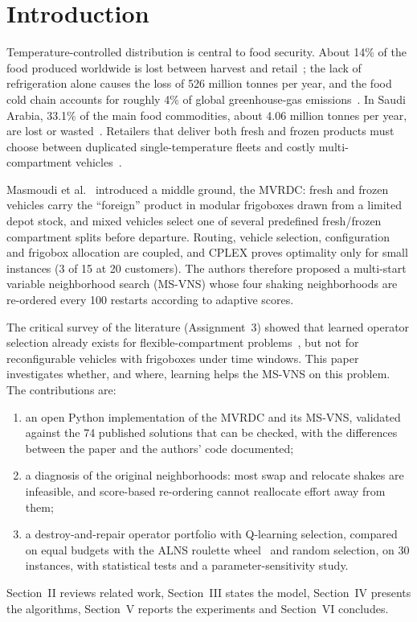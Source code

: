 \documentclass[conference]{IEEEtran}
\begin{document}
\section{Introduction}
Temperature-controlled distribution is central to food security. About 14\% of the food produced worldwide is lost between harvest and retail~\cite{fao2019}; the lack of refrigeration alone causes the loss of 526 million tonnes per year, and the food cold chain accounts for roughly 4\% of global greenhouse-gas emissions~\cite{unep2022}. In Saudi Arabia, 33.1\% of the main food commodities, about 4.06 million tonnes per year, are lost or wasted~\cite{alshabanat2021}. Retailers that deliver both fresh and frozen products must choose between duplicated single-temperature fleets and costly multi-compartment vehicles~\cite{ostermeier2021}.

Masmoudi et al.~\cite{masmoudi2026} introduced a middle ground, the MVRDC: fresh and frozen vehicles carry the ``foreign'' product in modular frigoboxes drawn from a limited depot stock, and mixed vehicles select one of several predefined fresh/frozen compartment splits before departure. Routing, vehicle selection, configuration and frigobox allocation are coupled, and CPLEX proves optimality only for small instances (3 of 15 at 20 customers). The authors therefore proposed a multi-start variable neighborhood search (MS-VNS) whose four shaking neighborhoods are re-ordered every 100 restarts according to adaptive scores.

The critical survey of the literature (Assignment~3) showed that learned operator selection already exists for flexible-compartment problems~\cite{huang2026,xiang2026,shang2023}, but not for reconfigurable vehicles with frigoboxes under time windows. This paper investigates whether, and where, learning helps the MS-VNS on this problem. The contributions are:
\begin{enumerate}
\item an open Python implementation of the MVRDC and its MS-VNS, validated against the 74 published solutions that can be checked, with the differences between the paper and the authors' code documented;
\item a diagnosis of the original neighborhoods: most swap and relocate shakes are infeasible, and score-based re-ordering cannot reallocate effort away from them;
\item a destroy-and-repair operator portfolio with Q-learning selection, compared on equal budgets with the ALNS roulette wheel~\cite{ropke2006} and random selection, on 30 instances, with statistical tests and a parameter-sensitivity study.
\end{enumerate}
Section~II reviews related work, Section~III states the model, Section~IV presents the algorithms, Section~V reports the experiments and Section~VI concludes.
\end{document}
